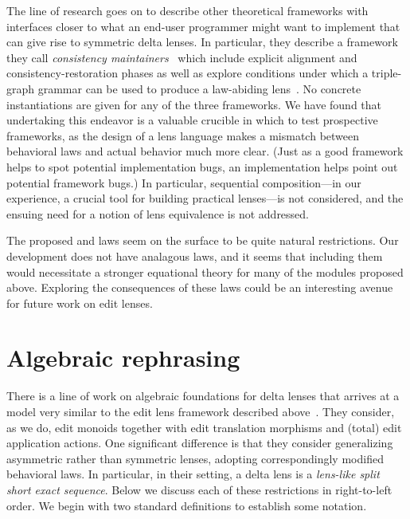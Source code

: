 The line of research goes on to describe other theoretical
frameworks with interfaces closer to what an end-user programmer might want
to implement that can give rise to symmetric delta lenses. In particular,
they describe a framework they call \emph{consistency
maintainers}~\cite{Diskin-Delta11} which include explicit alignment and
consistency-restoration phases as well as explore conditions under which a
triple-graph grammar can be used to produce a law-abiding
lens~\cite{hermann2011correctness}. No concrete instantiations are given for
any of the three frameworks. We have found that undertaking this endeavor is
a valuable crucible in which to test prospective frameworks, as the design
of a lens language makes a mismatch between behavioral laws and actual
behavior much more clear. (Just as a good framework helps to spot
potential implementation bugs, an implementation helps point out potential
framework bugs.) In particular, sequential composition---in our experience,
a crucial tool for building practical lenses---is not considered, and the
ensuing need for a notion of lens equivalence is not addressed.

The proposed  and  laws seem on the surface to
be quite natural restrictions. Our development does not have analagous laws,
and it seems that including them would necessitate a stronger equational
theory for many of the modules proposed above. Exploring the consequences of
these laws could be an interesting avenue for future work on edit lenses.

\section{Algebraic rephrasing}
\label{sec:algebraic}
There is a line of work on algebraic foundations for delta lenses that
arrives at a model very similar to the edit lens framework described
above~\cite{stevens2008tat}. They consider, as we do, edit monoids together
with edit translation morphisms and (total) edit application actions.
One significant difference is that they consider generalizing asymmetric
rather than symmetric lenses, adopting correspondingly modified behavioral
laws. In particular, in their setting, a delta lens is a \emph{lens-like
split short exact sequence}. Below we discuss each of these restrictions in
right-to-left order. We begin with two standard definitions to establish
some notation.

